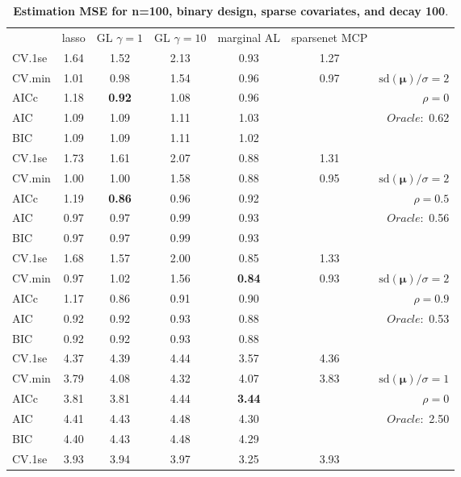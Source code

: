 \begin{table}\vspace{-.5cm}
\caption[l]{ { \bf Estimation MSE for n=100, binary design, 
sparse covariates, and  decay  100}.}
\vspace{-.5cm}
\footnotesize{}
\begin{center}
\begin{tabular}{l*{5}{c}|r}
& lasso & GL $\gamma=1$ & GL $\gamma=10$ & marginal AL & sparsenet MCP  & \\
 \cline{1-7}
CV.1se & 1.64 & 1.52 & 2.13 & 0.93 & 1.27 & \\
CV.min & 1.01 & 0.98 & 1.54 & 0.96 & 0.97 &  $\mathrm{sd}(\mathbf{\mu})/\sigma=2$ \\
AICc & 1.18 & {\bf 0.92} & 1.08 & 0.96 & & $\rho=0$ \\
AIC & 1.09 & 1.09 & 1.11 & 1.03 & &  \multirow{2}{*}{$Oracle: $ 0.62} \\
BIC & 1.09 & 1.09 & 1.11 & 1.02 & &  \\
 \hline 
CV.1se & 1.73 & 1.61 & 2.07 & 0.88 & 1.31 & \\
CV.min & 1.00 & 1.00 & 1.58 & 0.88 & 0.95 &  $\mathrm{sd}(\mathbf{\mu})/\sigma=2$ \\
AICc & 1.19 & {\bf 0.86} & 0.96 & 0.92 & & $\rho=0.5$ \\
AIC & 0.97 & 0.97 & 0.99 & 0.93 & &  \multirow{2}{*}{$Oracle: $ 0.56} \\
BIC & 0.97 & 0.97 & 0.99 & 0.93 & &  \\
 \hline 
CV.1se & 1.68 & 1.57 & 2.00 & 0.85 & 1.33 & \\
CV.min & 0.97 & 1.02 & 1.56 & {\bf 0.84} & 0.93 &  $\mathrm{sd}(\mathbf{\mu})/\sigma=2$ \\
AICc & 1.17 & 0.86 & 0.91 & 0.90 & & $\rho=0.9$ \\
AIC & 0.92 & 0.92 & 0.93 & 0.88 & &  \multirow{2}{*}{$Oracle: $ 0.53} \\
BIC & 0.92 & 0.92 & 0.93 & 0.88 & &  \\
 \hline 
CV.1se & 4.37 & 4.39 & 4.44 & 3.57 & 4.36 & \\
CV.min & 3.79 & 4.08 & 4.32 & 4.07 & 3.83 &  $\mathrm{sd}(\mathbf{\mu})/\sigma=1$ \\
AICc & 3.81 & 3.81 & 4.44 & {\bf 3.44} & & $\rho=0$ \\
AIC & 4.41 & 4.43 & 4.48 & 4.30 & &  \multirow{2}{*}{$Oracle: $ 2.50} \\
BIC & 4.40 & 4.43 & 4.48 & 4.29 & &  \\
 \hline 
CV.1se & 3.93 & 3.94 & 3.97 & 3.25 & 3.93 & \\

\end{tabular}
\end{center}
\end{table}
